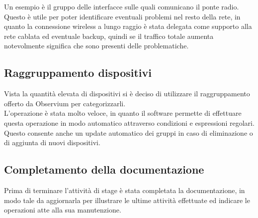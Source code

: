 \documentclass[Realizzazione.tex]{subfiles}
\begin{document}
Un esempio è il gruppo delle interfacce sulle quali comunicano il ponte radio. Questo è utile per poter identificare eventuali problemi nel resto della rete, in quanto la connessione wireless a lungo raggio è stata delegata come supporto alla rete cablata ed eventuale backup, quindi se il traffico totale aumenta notevolmente significa che sono presenti delle problematiche.


\subsection{Raggruppamento dispositivi}
Vista la quantità elevata di dispositivi si è deciso di utilizzare il raggruppamento offerto da Observium per categorizzarli. \\
L'operazione è stata molto veloce, in quanto il software permette di effettuare questa operazione in modo automatico attraverso condizioni e espressioni regolari. Questo consente anche un update automatico dei gruppi in caso di eliminazione o di aggiunta di nuovi dispositivi.

\subsection{Completamento della documentazione}
Prima di terminare l'attività di stage è stata completata la documentazione, in modo tale da aggiornarla per illustrare le ultime attività effettuate ed indicare le operazioni atte alla sua manutenzione.
\end{document}
